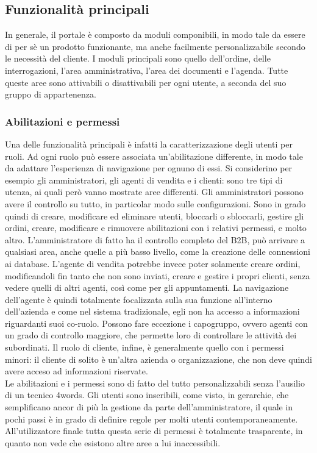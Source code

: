 \subsection{Funzionalità principali}
In generale, il portale è composto da moduli componibili, in modo tale da essere di per sè un prodotto funzionante, ma anche facilmente personalizzabile secondo le necessità del cliente. I moduli principali sono quello dell'ordine, delle interrogazioni, l'area amministrativa, l'area dei documenti e l'agenda. Tutte queste aree sono attivabili o disattivabili per ogni utente, a seconda del suo gruppo di appartenenza. 

\subsubsection{Abilitazioni e permessi}
Una delle funzionalità principali è infatti la caratterizzazione degli utenti per ruoli. Ad ogni ruolo può essere associata un'abilitazione differente, in modo tale da adattare l'esperienza di navigazione per ognuno di essi. Si considerino per esempio gli amministratori, gli agenti di vendita e i clienti: sono tre tipi di utenza, ai quali però vanno mostrate aree differenti. Gli amministratori possono avere il controllo su tutto, in particolar modo sulle configurazioni. Sono in grado quindi di creare, modificare ed eliminare utenti, bloccarli o sbloccarli, gestire gli ordini, creare, modificare e rimuovere abilitazioni con i relativi permessi, e molto altro. L'amministratore di fatto ha il controllo completo del B2B, può arrivare a qualsiasi area, anche quelle a più basso livello, come la creazione delle connessioni ai database. L'agente di vendita potrebbe invece poter solamente creare ordini, modificandoli fin tanto che non sono inviati, creare e gestire i propri clienti, senza vedere quelli di altri agenti, così come per gli appuntamenti. La navigazione dell'agente è quindi totalmente focalizzata sulla sua funzione all'interno dell'azienda e come nel sistema tradizionale, egli non ha accesso a informazioni riguardanti suoi co-ruolo. Possono fare eccezione i capogruppo, ovvero agenti con un grado di controllo maggiore, che permette loro di controllare le attività dei subordinati. Il ruolo di cliente, infine, è generalmente quello con i permessi minori: il cliente di solito è un'altra azienda o organizzazione, che non deve quindi avere acceso ad informazioni riservate.\\
Le abilitazioni e i permessi sono di fatto del tutto personalizzabili senza l'ausilio di un tecnico 4words. Gli utenti sono inseribili, come visto, in gerarchie, che semplificano ancor di più la gestione da parte dell'amministratore, il quale in pochi passi è in grado di definire regole per molti utenti contemporaneamente. All'utilizzatore finale tutta questa serie di permessi è totalmente trasparente, in quanto non vede che esistono altre aree a lui inaccessibili.

